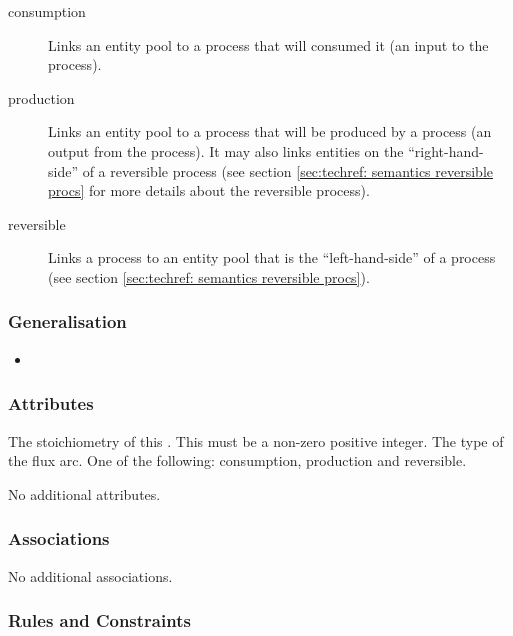 \begin{description}
\item[consumption] Links an entity pool to a process that will
  consumed it (an input to the process).
\item[production] Links an entity pool to a process that will be
produced by a process (an output from the process). It may also
links entities on the ``right-hand-side'' of a reversible process (see
section \ref{sec:techref: semantics reversible procs} for more details about the
reversible process).
\item[reversible] Links a process to an entity pool that is the
  ``left-hand-side'' of a process (see section  \ref{sec:techref: semantics reversible procs}).
\end{description}

\subsubsection{Generalisation}

\begin{itemize}
\item {}
\end{itemize}

\subsubsection{Attributes}

\begin{attributes}
   The stoichiometry of this
  . This must be a non-zero positive integer.
   The type of the flux arc. One of the
  following: consumption, production and reversible.
\end{attributes}

No additional attributes.

\subsubsection{Associations}

No additional associations.

\subsubsection{Rules and Constraints}

